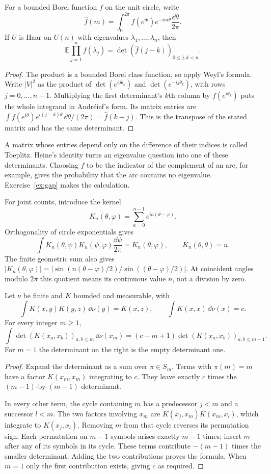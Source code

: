 \begin{theorem}\label{thm:heine}
For a bounded Borel function $f$ on the unit circle, write
\[
 \widehat f(m)=\int_0^{2\pi}f(e^{i\theta})e^{-im\theta}
                         \frac{\dd\theta}{2\pi}.
\]
If $U$ is Haar on $U(n)$ with eigenvalues $\lambda_1,\ldots,\lambda_n$,
then
\[
 \mathbb E\prod_{j=1}^nf(\lambda_j)
 =\det(\widehat f(j-k))_{0\le j,k<n}.
\]
\end{theorem}
\begin{proof}
The product is a bounded Borel class function, so apply Weyl's formula.
Write $|V|^2$ as the product of $\det(e^{ij\theta_k})$ and
$\det(e^{-ij\theta_k})$, with rows $j=0,\ldots,n-1$.
Multiplying the first determinant's $k$th column by $f(e^{i\theta_k})$
puts the whole integrand in Andr\'eief's form.
Its matrix entries are
$\int f(e^{i\theta})e^{i(j-k)\theta}\,\dd\theta/(2\pi)
=\widehat f(k-j)$. This is the transpose of the stated matrix and has
the same determinant.
\end{proof}

A matrix whose entries depend only on the difference of their indices
is called Toeplitz. Heine's identity turns an eigenvalue question into
one of these determinants. Choosing $f$ to be the indicator of the
complement of an arc, for example, gives the probability that the arc
contains no eigenvalue. Exercise~\ref{ex:gap} makes the calculation.

For joint counts, introduce the kernel
\[
 K_n(\theta,\varphi)=\sum_{a=0}^{n-1}e^{ia(\theta-\varphi)}.
\]
Orthogonality of circle exponentials gives
\[
 \int K_n(\theta,\psi)K_n(\psi,\varphi)
           \frac{\dd\psi}{2\pi}=K_n(\theta,\varphi),\qquad
 K_n(\theta,\theta)=n.
\]
The finite geometric sum also gives
$|K_n(\theta,\varphi)|=
|\sin(n(\theta-\varphi)/2)/\sin((\theta-\varphi)/2)|$.
At coincident angles modulo $2\pi$ this quotient means its continuous
value $n$, not a division by zero.

\begin{lemma}[Gaudin]\label{lem:gaudin}
Let $\nu$ be finite and $K$ bounded and measurable, with
\[
 \int K(x,y)K(y,z)\,\dd\nu(y)=K(x,z),\qquad
 \int K(x,x)\,\dd\nu(x)=c.
\]
For every integer $m\ge1$,
\[
 \int\det(K(x_a,x_b))_{a,b\le m}\,\dd\nu(x_m)
 =(c-m+1)\det(K(x_a,x_b))_{a,b\le m-1}.
\]
For $m=1$ the determinant on the right is the empty determinant one.
\end{lemma}
\begin{proof}
Expand the determinant as a sum over $\pi\in S_m$.
Terms with $\pi(m)=m$ have a factor $K(x_m,x_m)$ integrating to $c$.
They leave exactly $c$ times the $(m-1)$-by-$(m-1)$ determinant.

In every other term, the cycle containing $m$ has a predecessor $j<m$
and a successor $l<m$. The two factors involving $x_m$ are
$K(x_j,x_m)K(x_m,x_l)$, which integrate to $K(x_j,x_l)$.
Removing $m$ from that cycle reverses its permutation sign.
Each permutation on $m-1$ symbols arises exactly $m-1$ times: insert
$m$ after any of its symbols in its cycle.
These terms contribute $-(m-1)$ times the smaller determinant.
Adding the two contributions proves the formula. When $m=1$ only the
first contribution exists, giving $c$ as required.
\end{proof}

